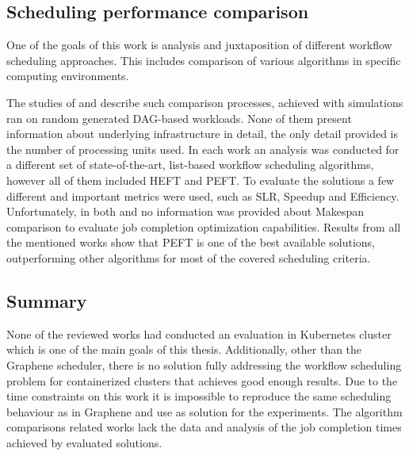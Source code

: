


\subsection{Scheduling performance comparison}\label{s:RelatedWork:Performance}

One of the goals of this work is analysis and juxtaposition of different workflow scheduling approaches.
This includes comparison of various algorithms in specific computing environments.

The studies of \cite{b:Performance-Analysis-Scheduling-DAG} and  \cite{b:Performance-Comparison-Scheduling-DAG} describe such comparison processes, achieved with simulations ran on random generated DAG-based workloads.
None of them present information about underlying infrastructure in detail, the only detail provided is the number of processing units used.
In each work an analysis was conducted for a different set of state-of-the-art, list-based workflow scheduling algorithms, however all of them included HEFT and PEFT.
To evaluate the solutions a few different and important metrics were used, such as SLR, Speedup and Efficiency.
Unfortunately, in both \cite{b:Performance-Analysis-Scheduling-DAG} and \cite{b:Performance-Comparison-Scheduling-DAG} no information was provided about Makespan comparison to evaluate job completion optimization capabilities.
Results from all the mentioned works show that PEFT is one of the best available solutions, outperforming other algorithms for most of the covered scheduling criteria.



\subsection{Summary}

None of the reviewed works had conducted an evaluation in Kubernetes cluster which is one of the main goals of this thesis.
Additionally, other than the Graphene scheduler, there is no solution fully addressing the workflow scheduling problem for containerized clusters that achieves good enough results. 
Due to the time constraints on this work it is impossible to reproduce the same scheduling behaviour as in Graphene and use as solution for the experiments.
The algorithm comparisons related works lack the data and analysis of the job completion times achieved by evaluated solutions.



